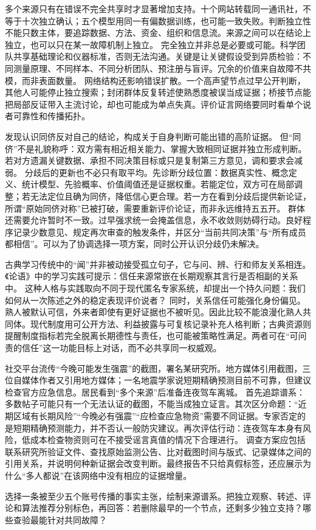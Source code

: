 多个来源只有在错误不完全共享时才显著增加支持。十个网站转载同一通讯社，不等于十次独立确认；五个模型用同一有偏数据训练，也可能一致失败。判断独立性不能只数主体，要追踪数据、方法、资金、组织和信息流。来源之间可以在结论上独立，也可以只在某一故障机制上独立。 完全独立并非总是必要或可能。科学团队共享基础理论和仪器标准，否则无法沟通。关键是让关键假设受到异质检验：不同测量原理、不同样本、不同分析团队、预注册与盲评。冗余的价值来自故障不共模，而非表面数量。 网络结构还影响错误扩散。一个高声望节点过早公开判断，其他人可能停止独立搜索；封闭群体反复转述使熟悉度被误当成证据；桥接节点能把局部反证带入主流讨论，却也可能成为单点失真。评价证言网络要同时看单个说者可靠性和传播拓扑。\parencite{oconnor2019}

发现认识同侪反对自己的结论，构成关于自身判断可能出错的高阶证据。\parencite{christensen2007,kelly2005} 但“同侪”不是礼貌称呼：双方需有相近相关能力、掌握大致相同证据并独立形成判断。若对方遗漏关键数据、承担不同决策目标或只是复制第三方意见，调和要求会减弱。 分歧后的更新也不必只有取平均。先诊断分歧位置：数据真实性、概念定义、统计模型、先验概率、价值阈值还是证据权重。若能定位，双方可在局部调整；若无法定位且确为同侪，降低信心更合理。若一方在看到分歧后提供新论证，所谓“原始同侪对称”已被打破，需要重新评价论证，而非永远维持五五开。 群体还需要允许暂时不一致。过早强求统一会掩盖信息，永不收敛则妨碍行动。良好程序记录少数意见、规定再次审查的触发条件，并区分“当前共同决策”与“所有成员都相信”。可以为了协调选择一项方案，同时公开认识分歧仍未解决。

古典学习传统中的“闻”并非被动接受孤立句子，它与问、辨、行和师友关系相连。《论语》中的学习实践可提示：信任来源常嵌在长期观察其言行是否相副的关系中。\parencite{analects2003} 这种人格与实践取向不同于现代匿名专家系统，却提出一个持久问题：我们如何从一次陈述之外的稳定表现评价说者？ 同时，关系信任可能强化身份偏见。熟人被默认可信，外来者即使有更好证据也不被听见。因此比较不能浪漫化熟人共同体。现代制度用可公开方法、利益披露与可复核记录补充人格判断；古典资源则提醒制度指标若完全脱离长期德性与责任，也可能被策略性满足。两者可在“可问责的信任”这一功能目标上对话，而不必共享同一权威观。

社交平台流传“今晚可能发生强震”的截图，署名某研究所。地方媒体引用截图，三位自媒体作者又引用地方媒体；一名地震学家说短期精确预测目前不可靠，但建议检查官方应急信息。居民看到“多个来源”后准备连夜驾车离城。 首先追踪谱系：多数帖子可能只有一个无法认证的截图，不能当成独立证言。其次区分命题：“近期区域有长期风险”“今晚必有强震”“应检查应急物资”需要不同证据。专家否定的是短期精确预测能力，并不否认一般防灾建议。再次评估行动：连夜驾车本身有风险，低成本检查物资则可在不接受谣言真值的情况下合理进行。 调查方案应包括联系研究所验证文件、查找原始监测公告、比对截图时间与版式、记录媒体之间的引用关系，并说明何种新证据会改变判断。最终报告不只给真假标签，还应展示为什么“多人都说”在该网络中没有相应的证据增量。

\begin{tcolorbox}[breakable,colback=white,colframe=blue!30!black,title={专题研读任务},fonttitle=\bfseries]
选择一条被至少五个账号传播的事实主张，绘制来源谱系。把独立观察、转述、评论和算法推荐分别标色，再回答：若删除最早的一个节点，还剩多少独立支持？哪些查验最能针对共同故障？
\end{tcolorbox}

